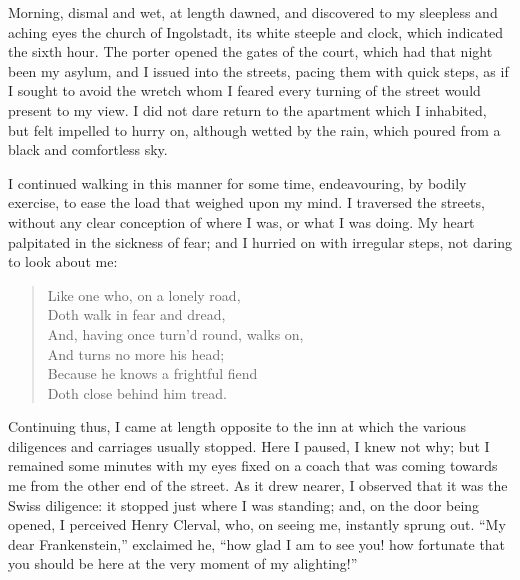 Morning, dismal and wet, at length
dawned, and discovered to my sleepless
and aching eyes the church of Ingolstadt,
its white steeple and clock, which
indicated the sixth hour. The porter
opened the gates of the court, which
had that night been my asylum, and
I issued into the streets, pacing them
with quick steps, as if I sought to avoid
the wretch whom I feared every turning
of the street would present to my
view. I did not dare return to the
apartment which I inhabited, but felt
impelled to hurry on, although wetted
by the rain, which poured from a black
and comfortless sky.

I continued walking in this manner
for some time, endeavouring, by bodily
exercise, to ease the load that weighed
upon my mind. I traversed the streets,
without any clear conception of where
I was, or what I was doing. My heart
palpitated in the sickness of fear; and I
hurried on with irregular steps, not
daring to look about me:

\vspace{0.5em plus 1.5em}
\begin{verse}
\small
Like one who, on a lonely road,\\
\hspace{1.5em} Doth walk in fear and dread,\\
And, having once turn'd round, walks on,\\
\hspace{1.5em} And turns no more his head;\\
Because he knows a frightful fiend\\
\hspace{1.5em} Doth close behind him tread.
\end{verse}
\vspace{0.5em plus 1.5em}

Continuing thus, I came at length
opposite to the inn at which the various
diligences and carriages usually stopped.
Here I paused, I knew not why; but I
remained some minutes with my eyes
fixed on a coach that was coming towards
me from the other end of the
street. As it drew nearer, I observed
that it was the Swiss diligence: it stopped
just where I was standing; and, on
the door being opened, I perceived
Henry Clerval, who, on seeing me, instantly
sprung out. ``My dear Frankenstein,''
exclaimed he, ``how glad I
am to see you! how fortunate that you
should be here at the very moment of
my alighting!''

